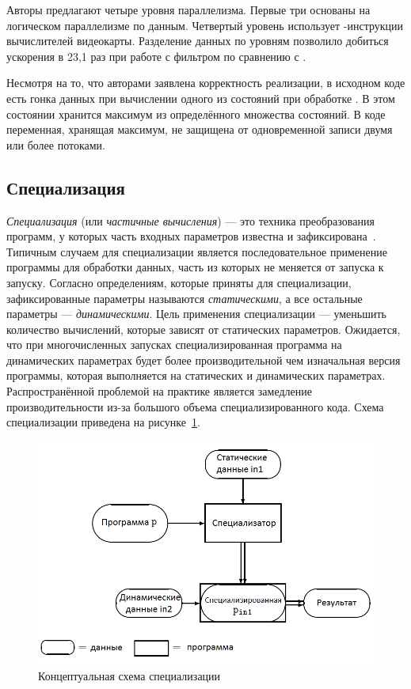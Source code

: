 Авторы предлагают четыре уровня параллелизма.
Первые три основаны на логическом параллелизме по данным.
Четвертый уровень использует -инструкции 
вычислителей видеокарты.
Разделение данных по уровням позволило добиться ускорения в 
23,1 раз при работе с фильтром  по сравнению с
.

Несмотря на то, что авторами заявлена корректность 
реализации, в исходном коде есть гонка данных при вычислении 
одного из состояний при обработке .
В этом состоянии хранится максимум из определённого множества состояний.
В коде  переменная, хранящая максимум, 
не защищена от одновременной записи двумя или более потоками.

\subsection{Специализация}
\emph{Специализация} (или \emph{частичные вычисления}) --- это техника 
преобразования программ, у которых часть входных параметров
известна и зафиксирована~\cite{Jones_spec}.
Типичным случаем для специализации является последовательное 
применение программы для обработки данных, часть из которых 
не меняется от запуска к запуску.
Согласно определениям, которые приняты для специализации, 
зафиксированные параметры называются \emph{статическими}, а 
все остальные параметры --- \emph{динамическими}.
Цель применения специализации --- уменьшить количество 
вычислений, которые зависят от статических параметров.
Ожидается, что при многочисленных запусках специализированная 
программа на динамических параметрах будет более 
производительной чем изначальная версия программы, которая 
выполняется на статических и динамических параметрах.
Распространённой проблемой на практике является замедление 
производительности из-за большого объема специализированного
кода.
Схема специализации приведена на рисунке~\ref{spec}.
\begin{figure}[h!]
  \centering
  \includegraphics[width=\columnwidth]{spec.png}
  \caption{Концептуальная схема специализации~\cite{Jones_spec}}
  \label{spec}
\end{figure}

